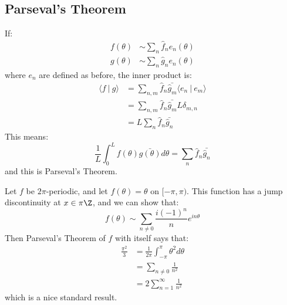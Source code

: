 \documentclass[../Main.tex]{subfiles}
\begin{document}
\subsection{Parseval's Theorem}
If:
\begin{align*}
    f(\theta) &\sim \sum_n \hat{f}_n e_n(\theta) \\
    g(\theta) &\sim \sum_n \hat{g}_n e_n(\theta)
\end{align*}
where $e_n$ are defined as before, the inner product is:
\begin{align*}
    \langle f~|~g\rangle &= \sum_{n, m} \hat{f}_n \bar{\hat{g}_m} \langle e_n~|~e_m\rangle \\
    &= \sum_{n, m} \hat{f}_n \bar{\hat{g}_m} L \delta_{m, n} \\
    &= L\sum_{n} \hat{f}_n \bar{\hat{g}_n}
\end{align*}    
This means:
\begin{equation}
    \frac{1}{L}\int_{0}^{L} f(\theta) \bar{g(\theta)} d\theta = \sum_{n} \hat{f}_n \bar{\hat{g}_n}
    \label{eqnParseval}
\end{equation}
and this is Parseval's Theorem.
\begin{example}
    Let $f$ be $2\pi$-periodic, and let $f(\theta) = \theta$ on $[-\pi, \pi)$. This function has a jump discontinuity at $x \in \pi \Z$, and we can show that:
    \begin{equation*}
        f(\theta) \sim \sum_{n \neq 0} \frac{i(-1)^n}{n}e^{in\theta}
    \end{equation*}
    Then Parseval's Theorem of $f$ with itself says that:
    \begin{align*}
        \frac{\pi^2}{3} &= \frac{1}{2\pi} \int_{-\pi}^{\pi} \theta^2 d\theta \\
        &= \sum_{n \neq 0} \frac{1}{n^2} \\
        &= 2\sum_{n = 1}^\infty \frac{1}{n^2}
    \end{align*}
    which is a nice standard result.
\end{example}
\end{document}
